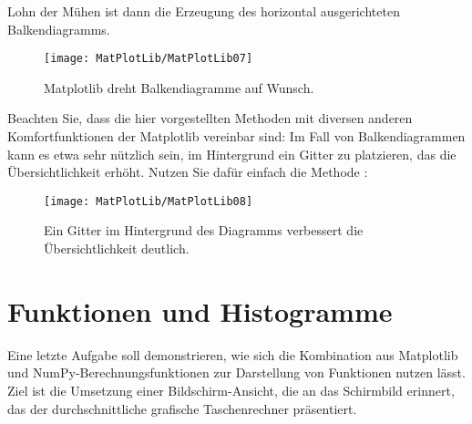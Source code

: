 


\medskip

Lohn der Mühen ist dann die Erzeugung des horizontal ausgerichteten Balkendiagramms.

\begin{figure}
  \begin{center}  
    \texttt{[image: MatPlotLib/MatPlotLib07]}      
        
    \caption{Matplotlib dreht Balkendiagramme auf Wunsch.}\label{Matplotlib07}
  \end{center}    
\end{figure}

Beachten Sie, dass die hier vorgestellten Methoden mit diversen anderen Komfortfunktionen der Matplotlib vereinbar sind: Im Fall von Balkendiagrammen kann es etwa sehr nützlich sein, im Hintergrund ein Gitter zu platzieren, das die Übersichtlichkeit erhöht. Nutzen Sie dafür einfach die Methode :

\begin{figure}
  \begin{center}  
    \texttt{[image: MatPlotLib/MatPlotLib08]}      
        
    \caption{Ein Gitter im Hintergrund des Diagramms verbessert die Übersichtlichkeit deutlich.}\label{Matplotlib08}
  \end{center}    
\end{figure}

\medskip








\section{Funktionen und Histogramme}

Eine letzte Aufgabe soll demonstrieren, wie sich die Kombination aus Matplotlib und NumPy-Berechnungsfunktionen zur Darstellung von Funktionen nutzen lässt. Ziel ist die Umsetzung einer Bildschirm-Ansicht, die an das Schirmbild erinnert, das der durchschnittliche grafische Taschenrechner präsentiert.

